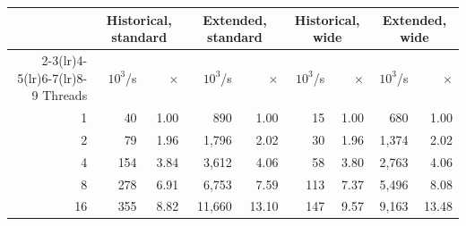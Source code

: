 \begin{tabular}{rrrrrrrrr}
\toprule
 & \multicolumn{2}{c}{Historical, standard} & \multicolumn{2}{c}{Extended, standard} & \multicolumn{2}{c}{Historical, wide} & \multicolumn{2}{c}{Extended, wide} \\
\cmidrule(lr){2-3}\cmidrule(lr){4-5}\cmidrule(lr){6-7}\cmidrule(lr){8-9}
Threads & $10^3$/s & $\times$ & $10^3$/s & $\times$ & $10^3$/s & $\times$ & $10^3$/s & $\times$ \\
\midrule
1 & 40 & 1.00 & 890 & 1.00 & 15 & 1.00 & 680 & 1.00 \\
2 & 79 & 1.96 & 1,796 & 2.02 & 30 & 1.96 & 1,374 & 2.02 \\
4 & 154 & 3.84 & 3,612 & 4.06 & 58 & 3.80 & 2,763 & 4.06 \\
8 & 278 & 6.91 & 6,753 & 7.59 & 113 & 7.37 & 5,496 & 8.08 \\
16 & 355 & 8.82 & 11,660 & 13.10 & 147 & 9.57 & 9,163 & 13.48 \\
\bottomrule
\end{tabular}
